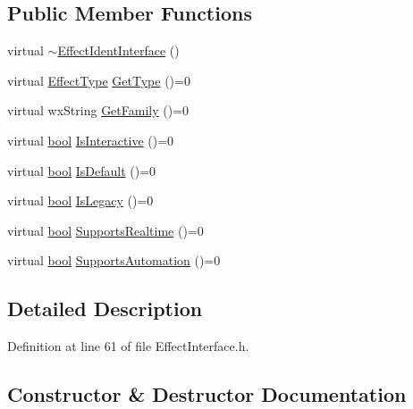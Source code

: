 \subsection*{Public Member Functions}
\begin{DoxyCompactItemize}
\item 
virtual \hyperlink{class_effect_ident_interface_a1888730c8be7c775f2e7d89db42be1a3}{$\sim$\+Effect\+Ident\+Interface} ()
\item 
virtual \hyperlink{_effect_interface_8h_a4809a7bb3fd1a421902a667cc1405d43}{Effect\+Type} \hyperlink{class_effect_ident_interface_a08b2eb484f1b2343f86bed4a6248307e}{Get\+Type} ()=0
\item 
virtual wx\+String \hyperlink{class_effect_ident_interface_a171e518b23936f2b7057b9fb1d37f72e}{Get\+Family} ()=0
\item 
virtual \hyperlink{mac_2config_2i386_2lib-src_2libsoxr_2soxr-config_8h_abb452686968e48b67397da5f97445f5b}{bool} \hyperlink{class_effect_ident_interface_a742b5c3b14e88d7437677fb18d93f6ef}{Is\+Interactive} ()=0
\item 
virtual \hyperlink{mac_2config_2i386_2lib-src_2libsoxr_2soxr-config_8h_abb452686968e48b67397da5f97445f5b}{bool} \hyperlink{class_effect_ident_interface_a1bc5cbe29962de3e846dd8954dee18c7}{Is\+Default} ()=0
\item 
virtual \hyperlink{mac_2config_2i386_2lib-src_2libsoxr_2soxr-config_8h_abb452686968e48b67397da5f97445f5b}{bool} \hyperlink{class_effect_ident_interface_abe06ca1e20aa66da3fb8ddd5494cbbed}{Is\+Legacy} ()=0
\item 
virtual \hyperlink{mac_2config_2i386_2lib-src_2libsoxr_2soxr-config_8h_abb452686968e48b67397da5f97445f5b}{bool} \hyperlink{class_effect_ident_interface_a42d470acafcef3b5eae159d2d337838a}{Supports\+Realtime} ()=0
\item 
virtual \hyperlink{mac_2config_2i386_2lib-src_2libsoxr_2soxr-config_8h_abb452686968e48b67397da5f97445f5b}{bool} \hyperlink{class_effect_ident_interface_afbfb3de03e5d109be11a458589274340}{Supports\+Automation} ()=0
\end{DoxyCompactItemize}


\subsection{Detailed Description}


Definition at line 61 of file Effect\+Interface.\+h.



\subsection{Constructor \& Destructor Documentation}
